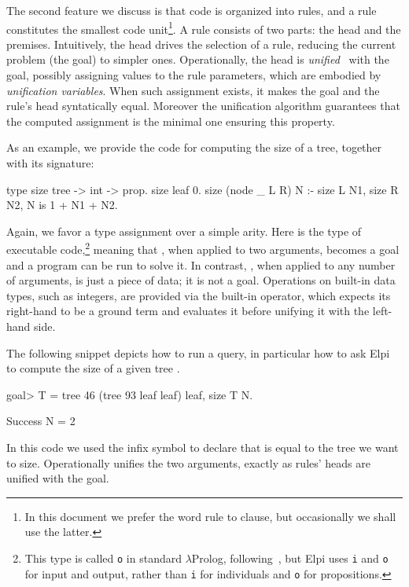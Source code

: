 \documentclass{these-ISSS}
\newenvironment{elpicode}
  {\VerbatimEnvironment\begin{elpibox}\begin{xelpicode}}{\end{xelpicode}
\end{elpibox}}
\newenvironment{elpioutput}
  {\VerbatimEnvironment\begin{outputbox}\begin{xelpicode}}{\end{xelpicode}
\end{outputbox}}
\begin{document}
The second feature we discuss is that code is organized into rules, and a rule
constitutes the smallest code unit\footnote{In this document we prefer the word
rule to clause, but occasionally we shall use the latter.}.
A rule consists of two parts: the head and the premises.
Intuitively, the head drives the selection of a rule, reducing the current
problem (the goal) to simpler ones. Operationally, the head is \emph{unified}~\cite{10.1145/321250.321253}
with
the goal, possibly assigning values to the rule parameters, which are
embodied by \emph{unification variables}. When such assignment exists, it makes the goal and
the rule's head syntatically equal. Moreover the unification algorithm guarantees that
the computed assignment is the minimal one ensuring this property.

As an example, we provide the code for
computing the size of a tree, together with its signature:

\begin{elpicode}
type size tree -> int -> prop.
size leaf 0.
size (node _ L R) N :- size L N1, size R N2, N is 1 + N1 + N2.
\end{elpicode}
Again, we favor a type assignment over a simple arity.
Here  is the type
of executable code,\footnote{This type is called \texttt{o} in
standard $\lambda$Prolog, 
following~\cite{Church1940AFO}, but Elpi uses \texttt{i} and \texttt{o}
for input and output, rather than \texttt{i}  for individuals and 
\texttt{o} for propositions.}
 meaning that , when applied to two arguments,
becomes a goal and a program can be run to solve it. In contrast, ,
when applied to any number of arguments, is just a piece of data; it is not a
goal. 
Operations on built-in data types, such as integers, are provided via the
built-in  operator, which expects its right-hand to be a ground
term and evaluates it before unifying it with the left-hand side.

The following snippet depicts how to run a query, in particular
how to ask Elpi to compute the size  of a given
tree .

\begin{elpioutput}
goal> T = tree 46 (tree 93 leaf leaf) leaf, size T N.

Success
  N = 2
\end{elpioutput}
In this code we used the infix \elpi{=} symbol to declare that
 is equal to the tree we want to size. Operationally
\elpi{=} unifies the two arguments, exactly as rules' heads are
unified with the goal.
\end{document}
